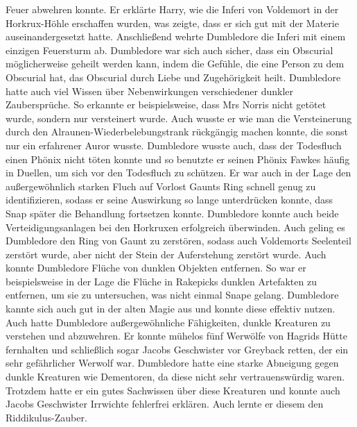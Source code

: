 \documentclass[a4paper, 10pt]{article}
\begin{document}
Feuer abwehren konnte. Er erklärte Harry, wie die Inferi von Voldemort in der Horkrux-Höhle erschaffen wurden, was zeigte, dass er sich gut mit der Materie auseinandergesetzt hatte. Anschließend wehrte Dumbledore die Inferi mit einem einzigen Feuersturm ab. Dumbledore war sich auch sicher, dass ein Obscurial möglicherweise geheilt werden kann, indem die Gefühle, die eine Person zu dem Obscurial hat, das Obscurial durch Liebe und Zugehörigkeit heilt. Dumbledore hatte auch viel Wissen über Nebenwirkungen verschiedener dunkler Zaubersprüche. So erkannte er beispielsweise, dass Mrs Norris nicht getötet wurde, sondern nur versteinert wurde. Auch wusste er wie man die Versteinerung durch den Alraunen-Wiederbelebungstrank rückgängig machen konnte, die sonst nur ein erfahrener Auror wusste. Dumbledore wusste auch, dass der Todesfluch einen Phönix nicht töten konnte und so benutzte er seinen Phönix Fawkes häufig in Duellen, um sich vor den Todesfluch zu schützen. Er war auch in der Lage den außergewöhnlich starken Fluch auf Vorlost Gaunts Ring schnell genug zu identifizieren, sodass er seine Auswirkung so lange unterdrücken konnte, dass Snap später die Behandlung fortsetzen konnte. Dumbledore konnte auch beide Verteidigungsanlagen bei den Horkruxen erfolgreich überwinden. Auch geling es Dumbledore den Ring von Gaunt zu zerstören, sodass auch Voldemorts Seelenteil zerstört wurde, aber nicht der Stein der Auferstehung zerstört wurde. Auch konnte Dumbledore Flüche von dunklen Objekten entfernen. So war er beispielsweise in der Lage die Flüche in Rakepicks dunklen Artefakten zu entfernen, um sie zu untersuchen, was nicht einmal Snape gelang. Dumbledore kannte sich auch gut in der alten Magie aus und konnte diese effektiv nutzen. Auch hatte Dumbledore außergewöhnliche Fähigkeiten, dunkle Kreaturen zu verstehen und abzuwehren. Er konnte mühelos fünf Werwölfe von Hagrids Hütte fernhalten und schließlich sogar Jacobs Geschwister vor Greyback retten, der ein sehr gefährlicher Werwolf war. Dumbledore hatte eine starke Abneigung gegen dunkle Kreaturen wie Dementoren, da diese nicht sehr vertrauenswürdig waren. Trotzdem hatte er ein gutes Sachwissen über diese Kreaturen und konnte auch Jacobs Geschwister Irrwichte fehlerfrei erklären. Auch lernte er diesem den Riddikulus-Zauber.
\end{document}

